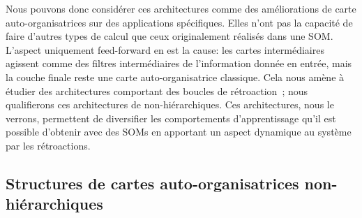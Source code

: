 \documentclass[../main]{subfiles}
\begin{document}
Nous pouvons donc considérer ces architectures comme des améliorations de carte auto-organisatrices sur des applications spécifiques. Elles n'ont pas la capacité de faire d'autres types de calcul que ceux originalement réalisés dans une SOM.
L'aspect uniquement feed-forward en est la cause: les cartes intermédiaires agissent comme des filtres intermédiaires de l'information donnée en entrée, mais la couche finale reste une carte auto-organisatrice classique.
Cela nous amène à étudier des architectures comportant des boucles de rétroaction~; nous qualifierons ces architectures de non-hiérarchiques. Ces architectures, nous le verrons, permettent de diversifier les comportements d'apprentissage qu'il est possible d'obtenir avec des SOMs en apportant un aspect dynamique au système par les rétroactions.



\subsection{Structures de cartes auto-organisatrices non-hiérarchiques}
\end{document}
